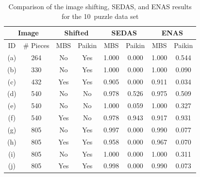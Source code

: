 \begin{table}[tb]
\begin{center}
\caption{Comparison of the image shifting, SEDAS, and ENAS results for the 10~puzzle data set}\label{tab:pomeranzBestBuddiesVisualizations}
\begin{tabular}{ c|c||c|c||c|c||c|c } 
 \toprule
 \multicolumn{2}{c||}{Image} & \multicolumn{2}{c||}{Shifted} & \multicolumn{2}{c||}{SEDAS} & \multicolumn{2}{c}{ENAS} \\
\hline
 ID  & \# Pieces & MBS & Paikin & MBS & Paikin & MBS & Paikin  \\ 
\hline \hline
 (a) &  264     & No  & Yes & 1.000  & 0.000 & 1.000 & 0.544 \\ 
\hline
 (b) &  330     & No  & Yes & 1.000  & 0.000 & 1.000 &  0.090 \\ 
\hline
 (c) &  432     & Yes & Yes & 0.905 &  0.000 & 0.911 & 0.034 \\  
\hline
 (d) &  540     & No  & No  & 0.978 & 0.526 & 0.975 & 0.509 \\ 
\hline
 (e) &  540     & No  & No  & 1.000  &  0.059 & 1.000  & 0.327 \\ 
\hline
 (f) &  540     & Yes & No  & 0.978 & 0.943 & 0.917 & 0.931 \\ 
\hline
 (g) &  805     & No  & Yes & 0.997 &  0.000 & 0.990 &  0.077 \\ 
\hline
 (h) &  805     & Yes & Yes & 0.958 &  0.000   & 0.967 &  0.070 \\ 
\hline
 (i) &  805     & No  & Yes & 1.000  &  0.000   & 1.000  &  0.311 \\ 
\hline
 (j) &  805     & Yes & Yes & 0.998 &  0.000   & 0.990 &   0.073 \\ 
 \bottomrule
\end{tabular}
\end{center}
\end{table}